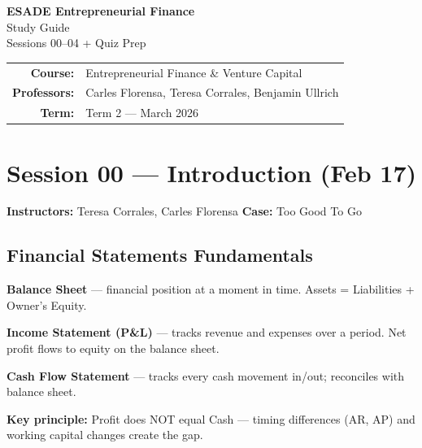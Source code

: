 \documentclass[a4paper,11pt]{article}
\begin{document}
\begin{titlepage}
\vspace*{4cm}
\begin{center}
{\LARGE\bfseries ESADE Entrepreneurial Finance}\\[0.8cm]
{\Large Study Guide}\\[0.5cm]
{\large Sessions 00--04 + Quiz Prep}\\[2cm]

\begin{tabular}{rl}
\textbf{Course:} & Entrepreneurial Finance \& Venture Capital \\[4pt]
\textbf{Professors:} & Carles Florensa, Teresa Corrales, Benjamin Ullrich \\[4pt]
\textbf{Term:} & Term 2 --- March 2026 \\
\end{tabular}
\end{center}
\vfill
\end{titlepage}

\tableofcontents
\newpage

\section{Session 00 --- Introduction (Feb 17)}
\textbf{Instructors:} Teresa Corrales, Carles Florensa \hfill \textbf{Case:} Too Good To Go

\subsection{Financial Statements Fundamentals}

\textbf{Balance Sheet} --- financial position at a moment in time. Assets = Liabilities + Owner's Equity.

\textbf{Income Statement (P\&L)} --- tracks revenue and expenses over a period. Net profit flows to equity on the balance sheet.

\textbf{Cash Flow Statement} --- tracks every cash movement in/out; reconciles with balance sheet.

\textbf{Key principle:} Profit does NOT equal Cash --- timing differences (AR, AP) and working capital changes create the gap.
\end{document}
